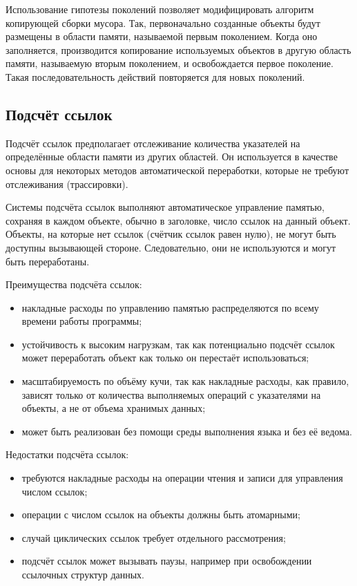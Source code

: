 
Использование гипотезы поколений позволяет модифицировать алгоритм копирующей сборки мусора. Так, первоначально созданные объекты будут размещены в области памяти, называемой первым поколением. Когда оно заполняется, производится копирование используемых объектов в другую область памяти, называемую вторым поколением, и освобождается первое поколение. Такая последовательность действий повторяется для новых поколений. \cite{cornell3}



\subsection{Подсчёт ссылок}

Подсчёт ссылок предполагает отслеживание количества указателей на определённые области памяти из других областей. Он используется в качестве основы для некоторых методов автоматической переработки, которые не требуют отслеживания (трассировки). \cite{recycling}

Системы подсчёта ссылок выполняют автоматическое управление памятью, сохраняя в каждом объекте, обычно в заголовке, число ссылок на данный объект. Объекты, на которые нет ссылок (счётчик ссылок равен нулю), не могут быть доступны вызывающей стороне. Следовательно, они не используются и могут быть переработаны. \cite{glossary}

Преимущества подсчёта ссылок:

\begin{itemize}[label*=---]
	\item накладные расходы по управлению памятью распределяются по всему времени работы программы; \cite{handbook}
	\item устойчивость к высоким нагрузкам, так как потенциально подсчёт ссылок может переработать объект как только он перестаёт использоваться; \cite{handbook}
	\item масштабируемость по объёму кучи, так как накладные расходы, как правило, зависят только от количества выполняемых операций с указателями на объекты, а не от объема хранимых данных; \cite{handbook}
	\item может быть реализован без помощи среды выполнения языка и без её ведома. \cite{handbook}
\end{itemize}

Недостатки подсчёта ссылок:

\begin{itemize}[label*=---]
	\item требуются накладные расходы на операции чтения и записи для управления числом ссылок;
	\item операции с числом ссылок на объекты должны быть атомарными; \cite{handbook}
	\item случай циклических ссылок требует отдельного рассмотрения; \cite{handbook}
	\item подсчёт ссылок может вызывать паузы, например при освобождении ссылочных структур данных. \cite{handbook}
\end{itemize}

